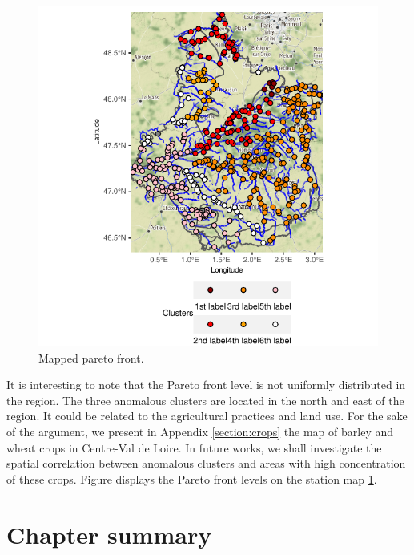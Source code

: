 \begin{figure}[htbp]
  \centering
  \includegraphics[]{figs/Chap5/Pareto_map.pdf}
  \caption{Mapped pareto front.}
  \label{fig:pareto:map}
\end{figure}

It is interesting to note that the Pareto front level is not uniformly distributed in the region. The three anomalous clusters are located in the north and east of the region. It could be related to the agricultural practices and land use. For the sake of the argument, we present in Appendix \ref{section:crops} the map of barley and wheat crops in Centre-Val de Loire. In future works, we shall investigate the spatial correlation between anomalous clusters and areas with high concentration of these crops. Figure  displays the Pareto front levels on the station map \ref{fig:pareto:map}.

\section{Chapter summary}

